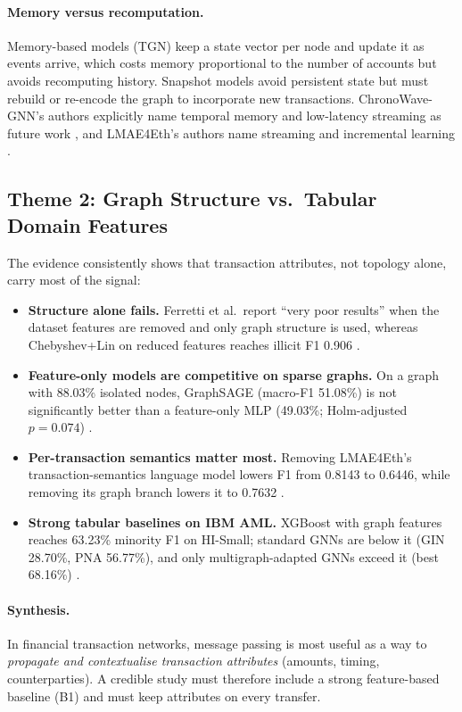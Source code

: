 \documentclass[11pt,a4paper]{article}
\begin{document}
\paragraph{Memory versus recomputation.} Memory-based models (TGN) keep a state vector per node and update it as events arrive, which costs memory proportional to the number of accounts but avoids recomputing history. Snapshot models avoid persistent state but must rebuild or re-encode the graph to incorporate new transactions. ChronoWave-GNN's authors explicitly name temporal memory and low-latency streaming as future work \cite{lin2026chronowave}, and LMAE4Eth's authors name streaming and incremental learning \cite{jia2025lmae4eth}.

\subsection{Theme 2: Graph Structure vs.\ Tabular Domain Features}
The evidence consistently shows that transaction attributes, not topology alone, carry most of the signal:
\begin{itemize}[leftmargin=*]
    \item \textbf{Structure alone fails.} Ferretti et al.\ report ``very poor results'' when the dataset features are removed and only graph structure is used, whereas Chebyshev+Lin on reduced features reaches illicit F1 0.906 \cite{ferretti2025aml}.
    \item \textbf{Feature-only models are competitive on sparse graphs.} On a graph with 88.03\% isolated nodes, GraphSAGE (macro-F1 51.08\%) is not significantly better than a feature-only MLP (49.03\%; Holm-adjusted $p=0.074$) \cite{alemari2026explainable}.
    \item \textbf{Per-transaction semantics matter most.} Removing LMAE4Eth's transaction-semantics language model lowers F1 from 0.8143 to 0.6446, while removing its graph branch lowers it to 0.7632 \cite{jia2025lmae4eth}.
    \item \textbf{Strong tabular baselines on IBM AML.} XGBoost with graph features reaches 63.23\% minority F1 on HI-Small; standard GNNs are below it (GIN 28.70\%, PNA 56.77\%), and only multigraph-adapted GNNs exceed it (best 68.16\%) \cite{egressy2024multigraph}.
\end{itemize}

\paragraph{Synthesis.} In financial transaction networks, message passing is most useful as a way to \emph{propagate and contextualise transaction attributes} (amounts, timing, counterparties). A credible study must therefore include a strong feature-based baseline (B1) and must keep attributes on every transfer.
\end{document}
